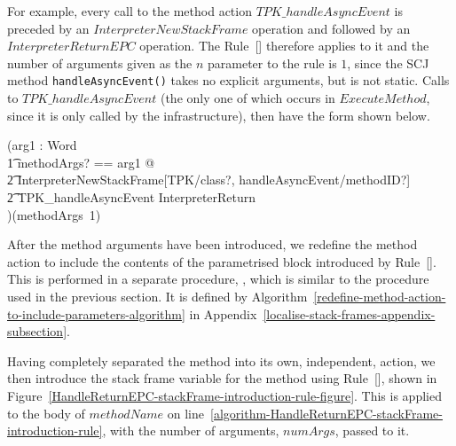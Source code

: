 For example, every call to the method action $TPK\_handleAsyncEvent$
is preceded by an $InterpreterNewStackFrame$ operation and followed by
an $InterpreterReturnEPC$ operation.
The Rule~[] therefore applies to
it and the number of arguments given as the $n$ parameter to the rule
is $1$, since the SCJ method \texttt{handleAsyncEvent()} takes no
explicit arguments, but is not static.
Calls to $TPK\_handleAsyncEvent$ (the only one of which occurs in
$ExecuteMethod$, since it is only called by the infrastructure), then
have the form shown below.
\begin{circus}
  (\circval arg1 : Word \circspot \\
      \t1 \lschexpract \exists methodArgs? == \langle arg1 \rangle @ \\
      \t2 InterpreterNewStackFrame[TPK/class?, handleAsyncEvent/methodID?] \rschexpract \circseq \\
      \t2 TPK\_handleAsyncEvent \circseq \lschexpract InterpreterReturn \rschexpract \\
      )(methodArgs~1)
\end{circus}

After the method arguments have been introduced, we redefine the
method action to include the contents of the parametrised block
introduced by Rule~[].
This is performed in a separate procedure,
, which is similar to
the  procedure used
in the previous section.
It is defined by
Algorithm~\ref{redefine-method-action-to-include-parameters-algorithm}
in Appendix~\ref{localise-stack-frames-appendix-subsection}.

Having completely separated the method into its own, independent,
action, we then introduce the stack frame variable for the method
using Rule~[],
shown in
Figure~\ref{HandleReturnEPC-stackFrame-introduction-rule-figure}.
This is applied to the body of $methodName$ on
line~\ref{algorithm-HandleReturnEPC-stackFrame-introduction-rule},
with the number of arguments, $numArgs$, passed to it.

